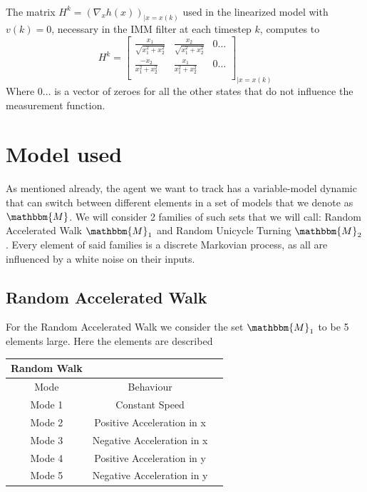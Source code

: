 \documentclass[twocolumn]{article}
\begin{document}
\\
The matrix $H^{k}=(\nabla_{x} h(x))_{|x=x(k)}$ used in the linearized model with $v(k)=0$, necessary in the IMM filter at each timestep $k$,
computes to
\begin{equation*}
    H^{k}= \begin{bmatrix}
        \frac{x_{1}}{\sqrt{x_{1}^{2}+x_{2}^{2}}} & \frac{x_{2}}{\sqrt{x_{1}^{2}+x_{2}^{2}}} & 0 \dots \\
        \frac{-x_{2}}{x_{1}^{2}+x_{2}^{2}}       & \frac{x_{1}}{x_{1}^{2}+x_{2}^{2}}        & 0 \dots \\
    \end{bmatrix}_{|x=x(k)}
\end{equation*}
Where $0\dots$ is a vector of zeroes for all the other states that do not influence the measurement function.

\section*{Model used}
As mentioned already, the agent we want to track has a variable-model dynamic that can switch between different elements in a set
of models that we denote as $\mathbbm{M}$. We will consider 2 families of such sets that we will call: Random Accelerated Walk $\mathbbm{M}_{1}$
and Random Unicycle Turning $\mathbbm{M}_{2}$. Every element of said families is a discrete Markovian process, as all are influenced by a white
noise on their inputs.
\subsection*{Random Accelerated Walk}
For the Random Accelerated Walk we consider the set $\mathbbm{M}_{1}$ to be 5 elements large.
Here the elements are described
\begin{center}
    \begin{tabular}{||c||c |c |}%
        \hline
        Random Walk                         \\
        \hline\hline
        Mode   & Behaviour                  \\ [0.5ex]
        \hline\hline
        Mode 1 & Constant Speed             \\
        \hline
        Mode 2 & Positive Acceleration in x \\
        \hline
        Mode 3 & Negative Acceleration in x \\
        \hline
        Mode 4 & Positive Acceleration in y \\
        \hline
        Mode 5 & Negative Acceleration in y \\ [1ex]
        \hline
    \end{tabular}
\end{center}
\end{document}
